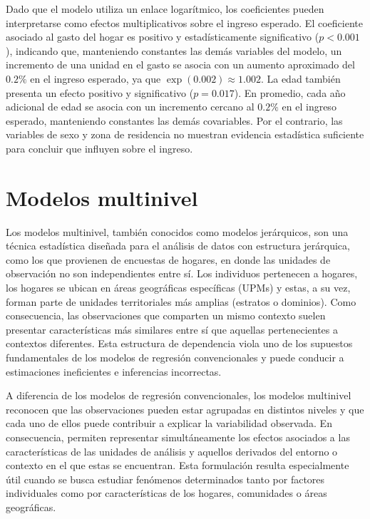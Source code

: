 \documentclass[
  spanish,
  12pt,
]{book}
\begin{document}
Dado que el modelo utiliza un enlace logarítmico, los coeficientes pueden interpretarse como efectos multiplicativos sobre el ingreso esperado. El coeficiente asociado al gasto del hogar es positivo y estadísticamente significativo (\(p<0.001\)), indicando que, manteniendo constantes las demás variables del modelo, un incremento de una unidad en el gasto se asocia con un aumento aproximado del \(0.2\%\) en el ingreso esperado, ya que \(\exp(0.002)\approx 1.002\). La edad también presenta un efecto positivo y significativo (\(p=0.017\)). En promedio, cada año adicional de edad se asocia con un incremento cercano al \(0.2\%\) en el ingreso esperado, manteniendo constantes las demás covariables. Por el contrario, las variables de sexo y zona de residencia no muestran evidencia estadística suficiente para concluir que influyen sobre el ingreso.

\chapter{Modelos multinivel}\label{cap7}

Los modelos multinivel, también conocidos como modelos jerárquicos, son una técnica estadística diseñada para el análisis de datos con estructura jerárquica, como los que provienen de encuestas de hogares, en donde las unidades de observación no son independientes entre sí. Los individuos pertenecen a hogares, los hogares se ubican en áreas geográficas específicas (UPMs) y estas, a su vez, forman parte de unidades territoriales más amplias (estratos o dominios). Como consecuencia, las observaciones que comparten un mismo contexto suelen presentar características más similares entre sí que aquellas pertenecientes a contextos diferentes. Esta estructura de dependencia viola uno de los supuestos fundamentales de los modelos de regresión convencionales y puede conducir a estimaciones ineficientes e inferencias incorrectas.

A diferencia de los modelos de regresión convencionales, los modelos multinivel reconocen que las observaciones pueden estar agrupadas en distintos niveles y que cada uno de ellos puede contribuir a explicar la variabilidad observada. En consecuencia, permiten representar simultáneamente los efectos asociados a las características de las unidades de análisis y aquellos derivados del entorno o contexto en el que estas se encuentran. Esta formulación resulta especialmente útil cuando se busca estudiar fenómenos determinados tanto por factores individuales como por características de los hogares, comunidades o áreas geográficas.
\end{document}
